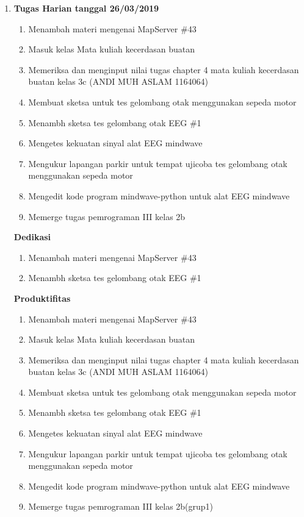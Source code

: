 \begin{enumerate}
\item \textbf{Tugas Harian tanggal 26/03/2019}
\begin{enumerate}
\item Menambah materi mengenai MapServer \#43
\item Masuk kelas Mata kuliah kecerdasan buatan
\item Memeriksa dan menginput nilai tugas chapter 4 mata kuliah kecerdasan buatan kelas 3c (ANDI MUH ASLAM 1164064)
\item Membuat sketsa untuk tes gelombang otak menggunakan sepeda motor
\item Menambh sketsa tes gelombang otak EEG \#1 
\item Mengetes kekuatan sinyal alat EEG mindwave
\item Mengukur lapangan parkir untuk tempat ujicoba tes gelombang otak menggunakan sepeda motor
\item Mengedit kode program mindwave-python untuk alat EEG mindwave
\item Memerge tugas pemrograman III kelas 2b
\end{enumerate}

\textbf{Dedikasi}
\begin{enumerate}
\item Menambah materi mengenai MapServer \#43
\item Menambh sketsa tes gelombang otak EEG \#1 
\end{enumerate}

\textbf{Produktifitas}
\begin{enumerate}
\item Menambah materi mengenai MapServer \#43
\item Masuk kelas Mata kuliah kecerdasan buatan
\item Memeriksa dan menginput nilai tugas chapter 4 mata kuliah kecerdasan buatan kelas 3c (ANDI MUH ASLAM 1164064)
\item Membuat sketsa untuk tes gelombang otak menggunakan sepeda motor
\item Menambh sketsa tes gelombang otak EEG \#1 
\item Mengetes kekuatan sinyal alat EEG mindwave
\item Mengukur lapangan parkir untuk tempat ujicoba tes gelombang otak menggunakan sepeda motor
\item Mengedit kode program mindwave-python untuk alat EEG mindwave
\item Memerge tugas pemrograman III kelas 2b(grup1)
\end{enumerate}


\end{enumerate}
